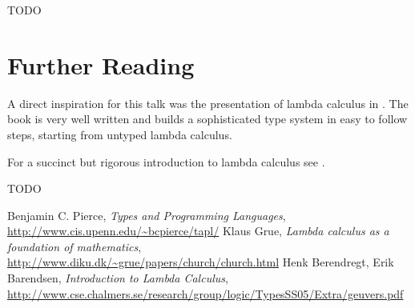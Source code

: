 \documentclass[11pt,twoside,a4paper]{article} %
\begin{document}
TODO

\section{Further Reading}

A direct inspiration for this talk was the presentation of lambda calculus in
\cite{TAPL}. The book is very well written and builds a sophisticated type
system in easy to follow steps, starting from untyped lambda calculus. 

For a succinct but rigorous introduction to lambda calculus see \cite{bb00}.

TODO

\begin{thebibliography}{9}
 Benjamin C. Pierce, \emph{Types and Programming Languages},
\url{http://www.cis.upenn.edu/~bcpierce/tapl/}
 Klaus Grue, \emph{Lambda calculus as a foundation of mathematics},
\url{http://www.diku.dk/~grue/papers/church/church.html}
 Henk Berendregt, Erik Barendsen, \emph{Introduction to Lambda
Calculus}, \url{http://www.cse.chalmers.se/research/group/logic/TypesSS05/Extra/geuvers.pdf}
\end{thebibliography}
\end{document}
